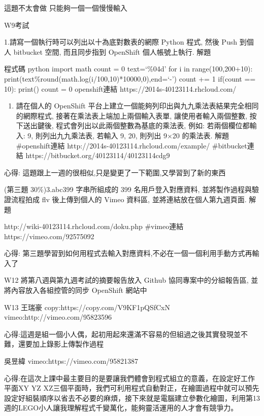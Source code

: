 \documentclass[]{article}
\begin{document}
這題不太會做 只能夠一個一個慢慢輸入

W9考試

1.請寫一個執行時可以列出以十為底對數表的網際 Python 程式, 然後 Push
到個人 bitbucket 空間, 而且同步指到 OpenShift 個人帳號上執行. 解題

程式碼 python import math count = 0 text=`\%04d' for i in
range(100,200+10):
print(text\%round(math.log(i/100,10)*10000,0),end=`-') count += 1
if(count == 10): print() count = 0 openshift連結
https://2014s-40123114.rhcloud.com/

\begin{enumerate}
\def\labelenumi{\arabic{enumi}.}
\setcounter{enumi}{1}
\itemsep1pt\parskip0pt
\item
  請在個人的 OpenShift
  平台上建立一個能夠列印出與九九乘法表結果完全相同的網際程式,
  接著在乘法表上端加上兩個輸入表單, 讓使用者輸入兩個整數, 按下送出鍵後,
  程式會列出以此兩個整數為基底的乘法表, 例如: 若兩個欄位都輸入: 9,
  則列出九九乘法表, 若輸入 9, 20, 則列出 9×20 的乘法表. 解題
  \#openshift連結 http://2014s-40123114.rhcloud.com/example/
  \#bitbucket連結 https://bitbucket.org/40123114/40123114cdg9
\end{enumerate}

心得: 這題跟上一週的很相似,只是變更了一下範圍,又學習到了新的東西

(第三題 30\%)3.abc399 字串所組成的 399 名用戶登入對應資料,
並將製作過程與驗證流程拍成 flv 後上傳到個人的 Vimeo 資料區,
並將連結放在個人第九週頁面. 解題

http://wiki-40123114.rhcloud.com/doku.php \#vimeo連結
https://vimeo.com/92575092

心得:
第三題學習到如何用程式去輸入對應資料,不必在一個一個利用手動方式再輸入了

W12 將第八週與第九週考試的摘要報告放入 Github 協同專案中的分組報告區,
並將內容放入各組控管的同步 OpenShift 網站中

W13 王瑞豪 copy:https://copy.com/V9KF1pQSfCxN
vimeo:http://vimeo.com/95823596

心得:這週是組一個小人偶，起初用起來還滿不容易的但組過之後其實發現並不難，還要加上錄影上傳製作過程

吳昱緯 vimeo:https://vimeo.com/95821387

心得:在這次上課中最主要目的是要讓我們體會到程式組立的意義，在設定好工作平面XY
YZ
XZ三個平面時，我們可利用程式自動對正，在繪圖過程中就可以預先設定好組裝順序以省去不必要的麻煩，接下來就是電腦建立參數化繪圖，利用第13週的LEGO小人讓我理解程式千變萬化，能夠靈活運用的人才會有競爭力。
\end{document}
